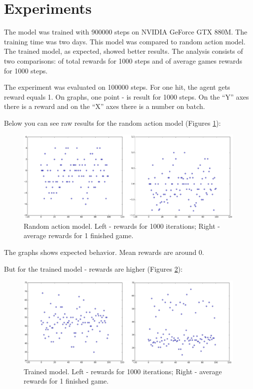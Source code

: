 \documentclass[a4paper,oneside,dvipsnames]{article}
\begin{document}
\section[Experiments]{Experiments}
The model was trained with 900000 steps on NVIDIA GeForce GTX 880M. The training time was two days. This model was compared to random action model. The trained model, as expected, showed better results. The analysis consists of two comparisons: of total rewards for 1000 steps and of average games rewards for 1000 steps. 

The experiment was evaluated on 100000 steps. For one hit, the agent gets reward equals 1. On graphs, one point - is result for 1000 steps. On the ``Y'' axes there is a reward and on the ``X'' axes there is a number on batch.

Below you can see raw results for the random action model (Figures \ref{fig:random}):

\begin{figure}[H]
\centering
{}
  \includegraphics[width=\linewidth]{random.png}
  \caption{Random action model. Left - rewards for 1000 iterations; Right - average rewards for 1 finished game.}\label{fig:random}
\endminipage\hfill
\end{figure} 


The graphs shows expected behavior. Mean rewards are around 0.

But for the trained model - rewards are higher (Figures \ref{fig:trained}):

\begin{figure}[H]
\centering
{}
  \includegraphics[width=\linewidth]{trained.png}
  \caption{Trained model. Left - rewards for 1000 iterations; Right - average rewards for 1 finished game.}\label{fig:trained}
\endminipage\hfill
\end{figure} 
\end{document}
